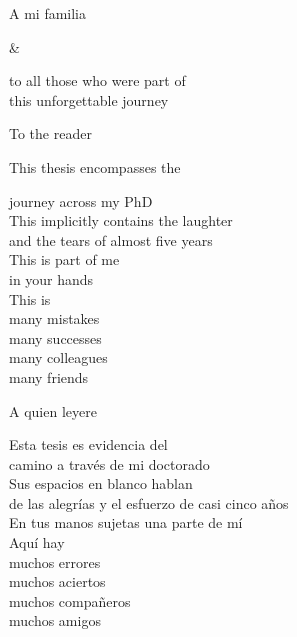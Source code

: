 
\begin{center}

\vspace*{140pt}
	
A mi familia 

\vspace{30pt}

\&

\vspace{30pt}

to all those who were part of \\this unforgettable journey 
\end{center}



\newpage


\begin{center}

\vspace*{10pt}	

	To the reader 
	
	\vspace{10pt}
	
	
	This thesis encompasses the 
	
	\vspace{1pt}
	
	journey across my PhD \\
	This implicitly contains the laughter \\
	and the tears of almost five years \\
	This is part of me \\
	in your hands \\
	This is \\
	many mistakes \\
	many successes \\
	many colleagues \\
	many friends
	
	
	\vspace{50pt}
	
	A quien leyere
	
	\vspace{15pt}
	
	Esta tesis es evidencia del \\
	camino a trav\'es de mi doctorado \\
	Sus espacios en blanco hablan \\
	de las alegr\'ias y el esfuerzo de casi cinco a\~nos \\
	En tus manos sujetas una parte de m\'i \\
	Aqu\'i hay \\
	muchos errores \\
	muchos aciertos \\
	muchos compa\~neros \\
	muchos amigos
	
	
	
\end{center}